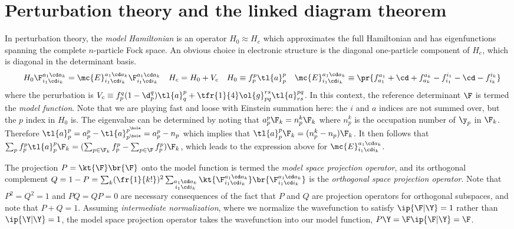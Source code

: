 \documentclass[11pt,fleqn]{article}
\numberwithin{equation}{section}
\begin{document}
\section{Perturbation theory and the linked diagram theorem}\label{sec:rspt}

\begin{dfn}\label{dfn:model-hamiltonian}
In perturbation theory, the \textit{model Hamiltonian} is an operator $H_0\approx H_e$ which approximates the full Hamiltonian and has eigenfunctions spanning the complete $n$-particle Fock space.
An obvious choice in electronic structure is the diagonal one-particle component of $H_e$, which is diagonal in the determinant basis.
\begin{align*}
&&
  H_0
  \F_{i_1\cd i_k}^{a_1\cd a_k}
=
  \mc{E}_{i_1\cd i_k}^{a_1\cd a_k}
  \F_{i_1\cd i_k}^{a_1\cd a_k}
&&
  H_c
=
  H_0
+
  V_c
&&
  H_0
\equiv
  f_p^p\tl{a}^p_p
&&
  \mc{E}_{i_1\cd i_k}^{a_1\cd a_k}
\equiv
\pr{
  f_{a_1}^{a_1}
+
  \cd
+
  f_{a_k}^{a_k}
-
  f_{i_1}^{i_1}
-
  \cd
-
  f_{i_k}^{i_k}
}
\end{align*}
where the perurbation is
$
  V_c
\equiv
  f_p^q(1-\d_p^q)
  \tl{a}^p_q
+
  \tfr{1}{4}
  \ol{g}_{pq}^{rs}
  \tl{a}^{pq}_{rs}
$.
In this context, the reference determinant $\F$ is termed the \textit{model function}.
Note that we are playing fast and loose with Einstein summation here: the $i$ and $a$ indices are not summed over, but the $p$ index in $H_0$ is.
The eigenvalue can be determined by noting that $a^p_p\F_k=n_p^k\F_k$ where $n_p^k$ is the occupation number of $\y_p$ in $\F_k$.
Therefore $\tl{a}^p_p=a^p_p-\tl{a}^{p^\hole}_{p^\hole}=a^p_p - n_p$ which implies that $\tl{a}^p_p\F_k=(n_p^k-n_p)\F_k$.
It then follows that
$
  \sum_p
  f_p^p
  \tl{a}^p_p
  \F_k
=
(
  \sum_{p\in \F_k}
  f_p^p
-
  \sum_{p\in \F}
  f_p^p
)
\F_k
$,
which leads to the expression above for $\mc{E}_{i_1\cd i_k}^{a_1\cd a_k}$.
\end{dfn}


\begin{dfn}\label{dfn:model-function}
The projection $P=\kt{\F}\br{\F}$ onto the model function is termed the \textit{model space projection operator}, and its orthogonal complement $Q=1-P=\sum_k(\fr{1}{k!})^2\sum_{\substack{a_1\cd a_k\\i_1\cd i_k}}\kt{\F_{i_1\cd i_k}^{a_1\cd a_k}}\br{\F_{i_1\cd i_k}^{a_1\cd a_k}}$ is the \textit{orthogonal space projection operator}.
Note that $P^2=Q^2=1$ and $PQ=QP=0$ are necessary consequences of the fact that $P$ and $Q$ are projection operators for orthogonal subspaces, and note that $P+Q=1$.
Assuming \textit{intermediate normalization}, where we normalize the wavefunction to satisfy $\ip{\F|\Y}=1$ rather than $\ip{\Y|\Y}=1$, the model space projection operator takes the wavefunction into our model function, $P\Y=\F\ip{\F|\Y}=\F$.
\end{dfn}
\end{document}
